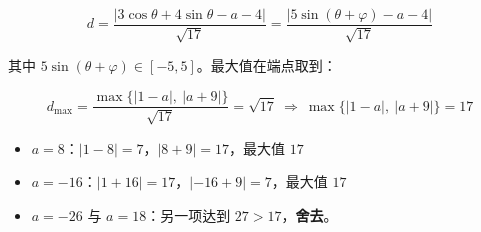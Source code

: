 \begin{answer}
\nopagebreak[4]
\[d=\frac{|3\cos\theta+4\sin\theta-a-4|}{\sqrt{17}}=\frac{\left|5\sin(\theta+\varphi)-a-4\right|}{\sqrt{17}}\]

其中 $5\sin(\theta+\varphi)\in[-5,5]$。最大值在端点取到：

\nopagebreak[4]
\[d_{\max}=\frac{\max\{|1-a|,\ |a+9|\}}{\sqrt{17}}=\sqrt{17}\ \Longrightarrow\ \max\{|1-a|,\ |a+9|\}=17\]

\begin{itemize}
\item $a=8$：$|1-8|=7$，$|8+9|=17$，最大值 $17$ 
\item $a=-16$：$|1+16|=17$，$|-16+9|=7$，最大值 $17$ 
\item $a=-26$ 与 $a=18$：另一项达到 $27>17$，\textbf{舍去}。
\end{itemize}

\par\medskip




\end{answer}

